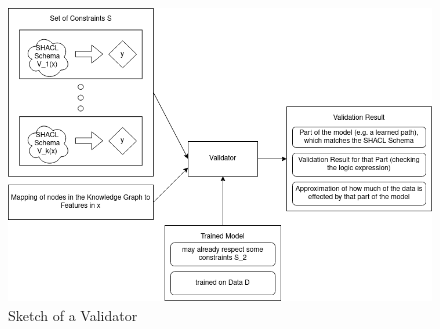 \documentclass[../../thesis]{subfiles}
\begin{document}
    \begin{figure}[H]
    \centering
    \includegraphics[width=\textwidth]{images/Validator.png}
    \caption{Sketch of a Validator}
    \end{figure}
    
\end{document}
